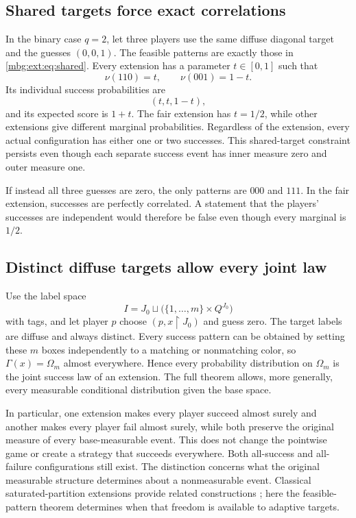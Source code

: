 \documentclass[11pt,letterpaper]{article}
\theoremstyle{definition}
\newcommand{\restr}{\mathbin{\upharpoonright}}
\begin{document}
\subsection{Shared targets force exact correlations}

In the binary case $q=2$, let three players use the same diffuse diagonal target and the guesses $(0,0,1)$. The feasible patterns are exactly those in \eqref{mbg:ext:eq:shared}. Every extension has a parameter $t\in[0,1]$ such that
\[
\nu(110)=t,\qquad\nu(001)=1-t.
\]
Its individual success probabilities are
\[
(t,t,1-t),
\]
and its expected score is $1+t$. The fair extension has $t=1/2$, while other extensions give different marginal probabilities. Regardless of the extension, every actual configuration has either one or two successes. This shared-target constraint persists even though each separate success event has inner measure zero and outer measure one.

If instead all three guesses are zero, the only patterns are $000$ and $111$. In the fair extension, successes are perfectly correlated. A statement that the players' successes are independent would therefore be false even though every marginal is $1/2$.

\subsection{Distinct diffuse targets allow every joint law}

Use the label space
\[
I=J_0\sqcup\bigl(\{1,\ldots,m\}\times Q^{J_0}\bigr)
\]
with tags, and let player $p$ choose $(p,x\restr J_0)$ and guess zero. The target labels are diffuse and always distinct. Every success pattern can be obtained by setting these $m$ boxes independently to a matching or nonmatching color, so $\Gamma(x)=\Omega_m$ almost everywhere. Hence every probability distribution on $\Omega_m$ is the joint success law of an extension. The full theorem allows, more generally, every measurable conditional distribution given the base space.

In particular, one extension makes every player succeed almost surely and another makes every player fail almost surely, while both preserve the original measure of every base-measurable event. This does not change the pointwise game or create a strategy that succeeds everywhere. Both all-success and all-failure configurations still exist. The distinction concerns what the original measurable structure determines about a nonmeasurable event. Classical saturated-partition extensions provide related constructions \cite{ext:Vidmar}; here the feasible-pattern theorem determines when that freedom is available to adaptive targets.
\end{document}
